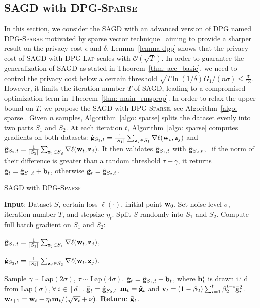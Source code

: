 \documentclass[11pt]{article}
\begin{document}
\subsection{\textsc{SAGD} with \textsc{DPG-Sparse}} \label{subsec: SAGD-sparse}
\vspace{-0.05in}
In this section, we consider the \textsc{SAGD} with an advanced version of DPG named \textsc{DPG-Sparse} motivated by sparse vector technique~\citep{dwro2014} aiming to provide a sharper result on the privacy cost $\epsilon$ and $\delta$.
Lemma~\ref{lemma dpp} shows that the privacy cost of \textsc{SAGD} with \textsc{DPG-Lap} scales with $\mathcal{O}(\sqrt{T})$. In order to guarantee the generalization of \textsc{SAGD} as stated in Theorem~\ref{thm: acc_basic}, we need to control the privacy cost below a certain threshold \ie $\sqrt{T \ln(1/\delta)} G_1/(n\sigma) \leq \frac{\sigma}{13}$. However, it limits the iteration number $T$ of \textsc{SAGD}, leading to a compromised optimization term in Theorem~\ref{thm: main_rmsprop}.  
In order to relax the upper bound on $T$, we propose the \textsc{SAGD} with \textsc{DPG-Sparse}, see Algorithm~\ref{algo: sparse}.
Given $n$ samples, Algorithm~\ref{algo: sparse} splits the dataset evenly into two parts $S_1$ and $S_2$. 
At each iteration $t$, Algorithm~\ref{algo: sparse} computes gradients on both datasets:
$\hat {\mathbf{g}}_{S_1,t} = \frac{1}{|S_1|} \sum_{\mathbf{z}_j \in S_1}\nabla \ell(\mathbf{w}_t, \mathbf{z}_j)$ and $\hat {\mathbf{g}}_{S_2,t} = \frac{1}{|S_2|} \sum_{\mathbf{z}_j \in S_2}\nabla \ell(\mathbf{w}_t, \mathbf{z}_j)$.
It then validates $\hat {\mathbf{g}}_{S_1,t} $ with $\hat {\mathbf{g}}_{S_2,t}$, \ie\ if the norm of their difference is greater than a random threshold $\tau-\gamma$, it returns $\tilde {\mathbf{g}}_t = \hat {\mathbf{g}}_{S_1,t} + \mathbf{b}_t$, otherwise $\tilde {\mathbf{g}}_t = \hat {\mathbf{g}}_{S_2,t}$.
\begin{algorithm}[H]
\caption{\textsc{SAGD} with \textsc{DPG-Sparse}}
\begin{algorithmic}[1]
\label{algo: sparse}
\STATE \textbf{Input}: Dataset $S$,  certain loss $\ell(\cdot)$, initial point $\mathbf{w}_0$.
\STATE Set  noise level $\sigma$, iteration number $T$,  and stepsize $\eta_t$.
\STATE Split $S$ randomly into $S_1$ and $S_2$. 
\STATE   Compute full batch gradient on $S_1$ and $S_2$:\\
\centerline{$\hat {\mathbf{g}}_{S_1,t} = \frac{1}{|S_1|} \sum_{\mathbf{z}_j \in S_1}\nabla \ell(\mathbf{w}_t, \mathbf{z}_j)$,}
\centerline{$\hat {\mathbf{g}}_{S_2,t} = \frac{1}{|S_2|} \sum_{\mathbf{z}_j \in S_2}\nabla \ell(\mathbf{w}_t, \mathbf{z}_j)$.}
\STATE Sample $\gamma \sim \text{Lap}(2\sigma)$, $\tau \sim \text{Lap}(4\sigma)$.
\STATE  $\tilde {\mathbf{g}}_t = \hat {\mathbf{g}}_{S_1,t} + \mathbf{b}_t$, where $\mathbf{b}_t^i$ is drawn i.i.d from Lap$(\sigma), \forall\, i \in [d]$.
\ELSE \STATE $\tilde {\mathbf{g}}_t = \hat {\mathbf{g}}_{S_2,t}$
\ENDIF
\STATE 
$\mathbf{m}_t = \tilde {\mathbf{g}}_t$ and $\mathbf{v}_t = \left(1-\beta_{2}\right) \sum_{i=1}^{t} \beta_{2}^{t-i} \tilde {\mathbf{g}}_{i}^{2}$.
\STATE $\mathbf{w}_{t+1}=\mathbf{w}_{t}-\eta_t \mathbf{m}_t /(\sqrt{\mathbf{v}_t}+\nu)$.
\ENDFOR 
\STATE \textbf{Return}: $\tilde {\mathbf{g}}_t$.
\end{algorithmic}
\end{algorithm}
\end{document}
